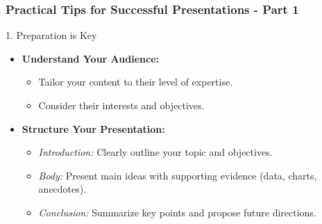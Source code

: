 \documentclass[aspectratio=169]{beamer}
\begin{document}
\begin{frame}[fragile]
    \frametitle{Practical Tips for Successful Presentations - Part 1}
    \begin{block}{1. Preparation is Key}
        \begin{itemize}
            \item \textbf{Understand Your Audience:}
            \begin{itemize}
                \item Tailor your content to their level of expertise.
                \item Consider their interests and objectives.
            \end{itemize}
            
            \item \textbf{Structure Your Presentation:}
            \begin{itemize}
                \item \textit{Introduction:} Clearly outline your topic and objectives.
                \item \textit{Body:} Present main ideas with supporting evidence (data, charts, anecdotes).
                \item \textit{Conclusion:} Summarize key points and propose future directions.
            \end{itemize}
        \end{itemize}
    \end{block}
\end{frame}
\end{document}
